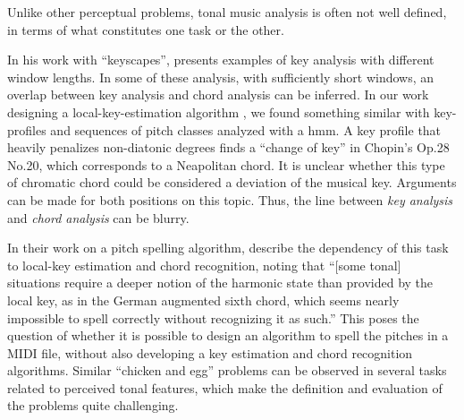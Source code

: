 

Unlike other perceptual problems, tonal music analysis is
often not well defined, in terms of what constitutes one
task or the other.


In his work with ``keyscapes'',
\textcite{sapp2011computational} presents examples of key
analysis with different window lengths. In some of these
analysis, with sufficiently short windows, an overlap
between key analysis and chord analysis can be inferred. In
our work designing a local-key-estimation algorithm
\parencite{napoleslopez2019keyfinding}, we found something
similar with key-profiles and sequences of pitch classes
analyzed with a \gls{hmm}. A key profile that
heavily penalizes non-diatonic degrees finds a ``change of
key'' in Chopin's Op.28 No.20, which corresponds to a
Neapolitan chord. It is unclear whether this type of
chromatic chord could be considered a deviation of the
musical key. Arguments can be made for both positions on
this topic. Thus, the line between \emph{key analysis} and
\emph{chord analysis} can be blurry.


In their work on a pitch spelling algorithm,
\textcite{teodoru2007pitch} describe the dependency of this
task to local-key estimation and chord recognition, noting
that ``[some tonal] situations require a deeper notion of
the harmonic state than provided by the local key, as in the
German augmented sixth chord, which seems nearly impossible
to spell correctly without recognizing it as such.'' This
poses the question of whether it is possible to design an
algorithm to spell the pitches in a MIDI file, without also
developing a key estimation and chord recognition
algorithms. Similar ``chicken and egg'' problems can be observed in several tasks related to perceived tonal features, which make the definition and evaluation of the problems quite challenging.
